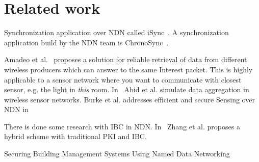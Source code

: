 \section{Related work}
Synchronization application over \gls{NDN} called iSync~\cite{DBLP:conf/acmicn/FuAC14}.
A synchronization application build by the \gls{NDN} team is ChronoSync~\cite{DBLP:conf/icnp/ZhuA13}.

Amadeo et al.~\cite{DBLP:conf/acmicn/AmadeoCM14} proposes a solution for reliable retrieval of data from different wireless producers which can answer to the same Interest packet. This is highly applicable to a sensor network where you want to communicate with closest sensor, e.g. the light in \textit{this} room.
In~\cite{DBLP:conf/noms/AbidySLF14} Abid et al. simulate data aggregation in wireless sensor networks.
Burke et al. addresses efficient and secure Sensing over \gls{NDN} in~\cite{DBLP:conf/nca/BurkeGNT14}

There is done some research with \gls{IBC} in \gls{NDN}. In~\cite{DBLP:conf/icnp/ZhangCXWSW11} Zhang et al. proposes a hybrid scheme with traditional \gls{PKI} and \gls{IBC}.

Securing Building Management Systems Using Named Data Networking~\cite{DBLP:journals/network/ShangDMBZ14}
